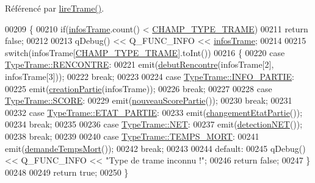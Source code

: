 Référencé par \hyperlink{_communication_8cpp_source_l00173}{lire\+Trame()}.


\begin{DoxyCode}
00209 \{
00210     \textcolor{keywordflow}{if}(\hyperlink{class_communication_a219fe9a4cd04470241f26f1f6159d721}{infosTrame}.count() < \hyperlink{_communication_8h_a2aab79787b26ad74e8cb5ab837236791}{CHAMP\_TYPE\_TRAME})
00211         \textcolor{keywordflow}{return} \textcolor{keyword}{false};
00212 
00213     qDebug() << Q\_FUNC\_INFO << \hyperlink{class_communication_a219fe9a4cd04470241f26f1f6159d721}{infosTrame};
00214 
00215     \textcolor{keywordflow}{switch}(infosTrame[\hyperlink{_communication_8h_a2aab79787b26ad74e8cb5ab837236791}{CHAMP\_TYPE\_TRAME}].toInt())
00216     \{
00220         \textcolor{keywordflow}{case} \hyperlink{_communication_8h_ad794b2a211d6c4ead603d7ebd097a992af8ce6111c15264884121829746e18a1f}{TypeTrame::RENCONTRE}:
00221             emit(\hyperlink{class_communication_af3430c844d728e4ec3961744243324e1}{debutRencontre}(infosTrame[2], infosTrame[3]));
00222             \textcolor{keywordflow}{break};
00223 
00224         \textcolor{keywordflow}{case} \hyperlink{_communication_8h_ad794b2a211d6c4ead603d7ebd097a992ac3a2021df6ca4ad18f8af3ce95931122}{TypeTrame::INFO\_PARTIE}:
00225             emit(\hyperlink{class_communication_a3d8a1dccee9867e6b84932ddc3072b45}{creationPartie}(infosTrame));
00226             \textcolor{keywordflow}{break};
00227 
00228         \textcolor{keywordflow}{case} \hyperlink{_communication_8h_ad794b2a211d6c4ead603d7ebd097a992af57444a2814db96222f09035ff269767}{TypeTrame::SCORE}:
00229             emit(\hyperlink{class_communication_acf4446d47652e0c508296e52df6fb11b}{nouveauScorePartie}());
00230             \textcolor{keywordflow}{break};
00231 
00232         \textcolor{keywordflow}{case} \hyperlink{_communication_8h_ad794b2a211d6c4ead603d7ebd097a992a6f91d1f6dd2600af9ca6a66ffe2adba2}{TypeTrame::ETAT\_PARTIE}:
00233             emit(\hyperlink{class_communication_af5444d470230a6e817ca8bc9484eb169}{changementEtatPartie}());
00234             \textcolor{keywordflow}{break};
00235 
00236         \textcolor{keywordflow}{case} \hyperlink{_communication_8h_ad794b2a211d6c4ead603d7ebd097a992a09c331e69591a2470471d457a17b413c}{TypeTrame::NET}:
00237             emit(\hyperlink{class_communication_a4c828450e0ff92818c878ee28f240662}{detectionNET}());
00238             \textcolor{keywordflow}{break};
00239 
00240         \textcolor{keywordflow}{case} \hyperlink{_communication_8h_ad794b2a211d6c4ead603d7ebd097a992a2f4a926417575653ebbe1ca64a16974f}{TypeTrame::TEMPS\_MORT}:
00241             emit(\hyperlink{class_communication_ab2dd9f10ceaba18016017104683b6fc1}{demandeTempsMort}());
00242             \textcolor{keywordflow}{break};
00243 
00244         \textcolor{keywordflow}{default}:
00245             qDebug() << Q\_FUNC\_INFO << \textcolor{stringliteral}{"Type de trame inconnu !"};
00246             \textcolor{keywordflow}{return} \textcolor{keyword}{false};
00247     \}
00248 
00249     \textcolor{keywordflow}{return} \textcolor{keyword}{true};
00250 \}
\end{DoxyCode}


